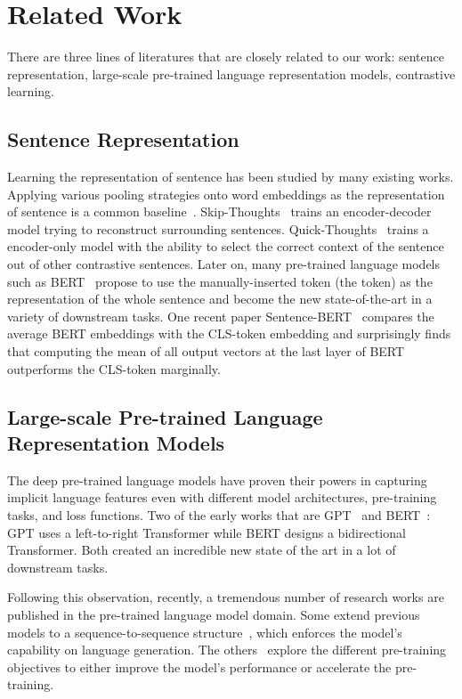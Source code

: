 \documentclass[11pt,a4paper]{article}
\begin{document}
 \section{Related Work} \label{related-work}
There are three lines of literatures that are closely related to our work: sentence representation, large-scale pre-trained language representation models, contrastive learning. 


\subsection{Sentence Representation}
Learning the representation of sentence has been studied by many existing works. Applying various pooling strategies onto word embeddings as the representation of sentence is a common baseline~\cite{iyyer2015deep, shen2018baseline, reimers2019sentence}. 
Skip-Thoughts~\cite{kiros2015skip} trains an encoder-decoder model trying to reconstruct surrounding sentences. Quick-Thoughts~\cite{logeswaran2018efficient} trains a encoder-only model with the ability to select the correct context of the sentence out of other contrastive sentences. Later on, many pre-trained language models such as BERT~\cite{devlin2019bert} propose to use the manually-inserted token (the  token) as the representation of the whole sentence and become the new state-of-the-art in a variety of downstream tasks. One recent paper Sentence-BERT~\cite{reimers2019sentence} compares the average BERT embeddings with the CLS-token embedding and surprisingly finds that computing the mean of all output vectors at the last layer of BERT outperforms the CLS-token marginally.

\subsection{Large-scale Pre-trained Language Representation Models} \label{sec2.2}

The deep pre-trained language models have proven their powers in capturing implicit language features even with different model architectures, pre-training tasks, and loss functions. Two of the early works that are GPT~\cite{radford2018improving} and BERT~\cite{devlin2019bert}: GPT uses a left-to-right Transformer while BERT designs a bidirectional Transformer. Both created an incredible new state of the art in a lot of downstream tasks.


Following this observation, recently, a tremendous number of research works are published in the pre-trained language model domain. Some extend previous models to a sequence-to-sequence structure~\cite{song2019mass, lewis2019bart, liu2020multilingual}, which enforces the model's capability on language generation. The others~\cite{yang2019xlnet,liu2019roberta,clark2020electra} explore the different pre-training objectives to either improve the model's performance or accelerate the pre-training. 
\end{document}
